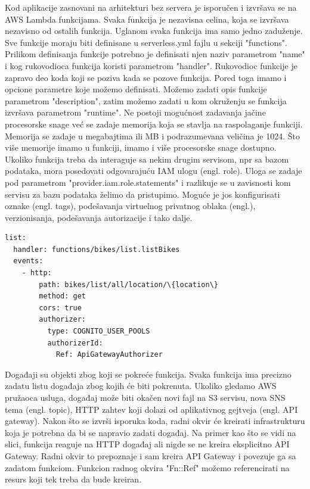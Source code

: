 \documentclass[12pt,oneside]{memoir}
\begin{document}
Kod aplikacije zasnovani na arhitekturi bez servera je isporučen i izvršava se na AWS Lambda funkcijama. Svaka funkcija je nezavisna celina, koja se izvršava nezavisno od ostalih funkcija. Uglanom svaka funkcija ima samo jedno zaduženje. Sve funkcije moraju biti definisane u serverless.yml fajlu u sekciji "functions". Prilikom definisanja funkcije potrebno je definisati njen naziv parametrom "name" i kog rukovodioca funkcija koristi parametrom "handler". Rukovodioc funkcije je zapravo deo koda koji se poziva kada se pozove funkcija. Pored toga imamo i opcione parametre koje možemo definisati. Možemo zadati opis funkcije parametrom "description", zatim možemo zadati u kom okruženju se funkcija izvršava parametrom "runtime". Ne postoji mogućnost zadavanja jačine procesorske snage već se zadaje memorija koja se stavlja na raspolaganje funkciji. Memorija se zadaje u megabajtima ili MB i podrazumevana veličina je 1024. Što više memorije imamo u funkciji, imamo i više procesorske snage dostupno. Ukoliko funkcija treba da interaguje sa nekim drugim servisom, npr sa bazom podataka, mora posedovati odgovarajuću IAM ulogu (engl. role). Uloga se zadaje pod parametrom "provider.iam.role.statements" i razlikuje se u zavisnosti kom servisu za bazu podataka želimo da pristupimo. Moguće je jos konfigurisati oznake (engl. tags), podešavanja virtuelnog privatnog oblaka (engl.), verzionisanja, podešavanja autorizacije i tako dalje.
 
\begin{lstlisting}
list:
  handler: functions/bikes/list.listBikes
  events:
    - http:
        path: bikes/list/all/location/\{location\}
        method: get
        cors: true
        authorizer:
          type: COGNITO_USER_POOLS
          authorizerId:
            Ref: ApiGatewayAuthorizer
\end{lstlisting}
 
Događaji su objekti zbog koji se pokreće funkcija. Svaka funkcija ima precizno zadatu listu događaja zbog kojih će biti pokrenuta. Ukoliko gledamo AWS pružaoca usluga, događaj može biti okačen novi fajl na S3 servisu, nova SNS tema (engl. topic), HTTP zahtev koji dolazi od aplikativnog gejtveja (engl. API gateway). Nakon što se izvrši isporuka koda, radni okvir će kreirati infrastrukturu koja je potrebna da bi se napravio zadati događaj. Na primer kao što se vidi na slici, funkcija reaguje na HTTP događaj ali nigde se ne kreira eksplicitno API Gateway. Radni okvir to prepoznaje i sam kreira API Gateway i povezuje ga sa zadatom funkciom. Funkcion radnog okvira "Fn::Ref" možemo referencirati na resurs koji tek treba da bude kreiran.
 
\end{document}
